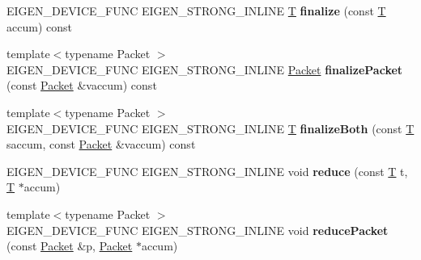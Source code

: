 \begin{DoxyCompactItemize}
\item 
\mbox{\label{struct_eigen_1_1internal_1_1_mean_reducer_a407eb7c15f632bde4e6d43e8c90ee92f}} 
E\+I\+G\+E\+N\+\_\+\+D\+E\+V\+I\+C\+E\+\_\+\+F\+U\+NC E\+I\+G\+E\+N\+\_\+\+S\+T\+R\+O\+N\+G\+\_\+\+I\+N\+L\+I\+NE \hyperlink{group___sparse_core___module}{T} {\bfseries finalize} (const \hyperlink{group___sparse_core___module}{T} accum) const
\item 
\mbox{\label{struct_eigen_1_1internal_1_1_mean_reducer_a25d3b4bcf0f09611dd84b8c133f2e5a8}} 
{\footnotesize template$<$typename Packet $>$ }\\E\+I\+G\+E\+N\+\_\+\+D\+E\+V\+I\+C\+E\+\_\+\+F\+U\+NC E\+I\+G\+E\+N\+\_\+\+S\+T\+R\+O\+N\+G\+\_\+\+I\+N\+L\+I\+NE \hyperlink{union_eigen_1_1internal_1_1_packet}{Packet} {\bfseries finalize\+Packet} (const \hyperlink{union_eigen_1_1internal_1_1_packet}{Packet} \&vaccum) const
\item 
\mbox{\label{struct_eigen_1_1internal_1_1_mean_reducer_aefe62aa35a6ed4cfd76ec4cc853606dc}} 
{\footnotesize template$<$typename Packet $>$ }\\E\+I\+G\+E\+N\+\_\+\+D\+E\+V\+I\+C\+E\+\_\+\+F\+U\+NC E\+I\+G\+E\+N\+\_\+\+S\+T\+R\+O\+N\+G\+\_\+\+I\+N\+L\+I\+NE \hyperlink{group___sparse_core___module}{T} {\bfseries finalize\+Both} (const \hyperlink{group___sparse_core___module}{T} saccum, const \hyperlink{union_eigen_1_1internal_1_1_packet}{Packet} \&vaccum) const
\item 
\mbox{\label{struct_eigen_1_1internal_1_1_mean_reducer_adecc23997b0000f8d1ab64e25ab0dee4}} 
E\+I\+G\+E\+N\+\_\+\+D\+E\+V\+I\+C\+E\+\_\+\+F\+U\+NC E\+I\+G\+E\+N\+\_\+\+S\+T\+R\+O\+N\+G\+\_\+\+I\+N\+L\+I\+NE void {\bfseries reduce} (const \hyperlink{group___sparse_core___module}{T} t, \hyperlink{group___sparse_core___module}{T} $\ast$accum)
\item 
\mbox{\label{struct_eigen_1_1internal_1_1_mean_reducer_a5f5ab34d27356ed03bf03c53be5820e3}} 
{\footnotesize template$<$typename Packet $>$ }\\E\+I\+G\+E\+N\+\_\+\+D\+E\+V\+I\+C\+E\+\_\+\+F\+U\+NC E\+I\+G\+E\+N\+\_\+\+S\+T\+R\+O\+N\+G\+\_\+\+I\+N\+L\+I\+NE void {\bfseries reduce\+Packet} (const \hyperlink{union_eigen_1_1internal_1_1_packet}{Packet} \&p, \hyperlink{union_eigen_1_1internal_1_1_packet}{Packet} $\ast$accum)

\end{DoxyCompactItemize}
